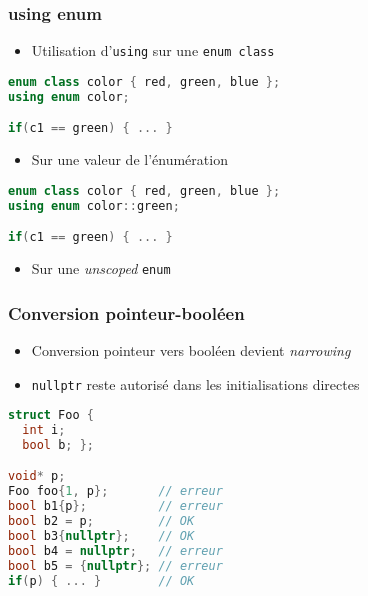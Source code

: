 \documentclass[C++.tex]{subfiles}
\begin{document}
\begin{frame}[fragile]
	\frametitle{using enum}
	\begin{itemize}
		\item Utilisation d'\lstinline|using| sur une \lstinline|enum class|
	\end{itemize}

	\begin{lstlisting}[language=C++]
enum class color { red, green, blue };
using enum color;

if(c1 == green) { ... } \end{lstlisting}

	\begin{itemize}
		\item Sur une valeur de l'énumération
	\end{itemize}

	\begin{lstlisting}[language=C++]
enum class color { red, green, blue };
using enum color::green;

if(c1 == green) { ... }\end{lstlisting}

	\begin{itemize}
		\item Sur une \textit{unscoped} \lstinline|enum|
	\end{itemize}
\end{frame}

\begin{frame}[fragile]
	\frametitle{Conversion pointeur-booléen}
	\begin{itemize}
		\item Conversion pointeur vers booléen devient \textit{narrowing}


		\item \lstinline|nullptr| reste autorisé dans les initialisations directes
	\end{itemize}
		
	\begin{lstlisting}[language=C++]
struct Foo {
  int i;
  bool b; };

void* p;
Foo foo{1, p};       // erreur
bool b1{p};          // erreur
bool b2 = p;         // OK
bool b3{nullptr};    // OK
bool b4 = nullptr;   // erreur
bool b5 = {nullptr}; // erreur
if(p) { ... }        // OK\end{lstlisting}

\end{frame}
\end{document}
